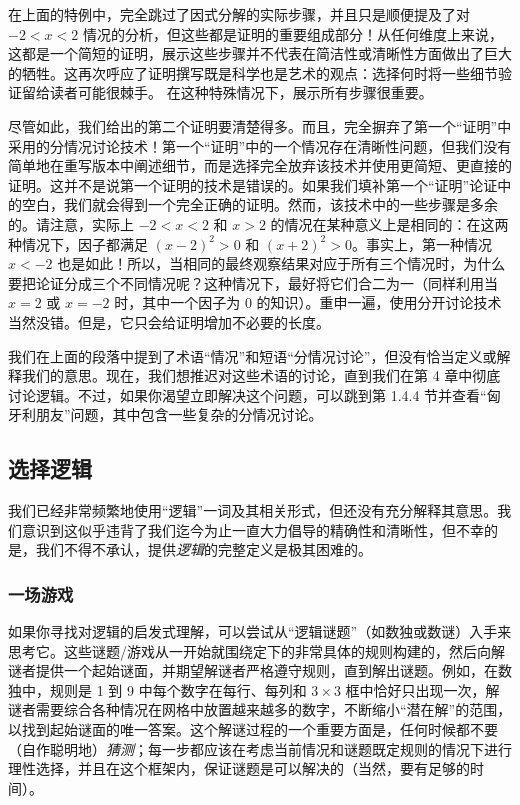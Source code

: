 在上面的特例中，完全跳过了因式分解的实际步骤，并且只是顺便提及了对 $-2 < x < 2$ 情况的分析，但这些都是证明的重要组成部分！从任何维度上来说，这都是一个简短的证明，展示这些步骤并不代表在简洁性或清晰性方面做出了巨大的牺牲。这再次呼应了证明撰写既是科学也是艺术的观点：选择何时将一些细节验证留给读者可能很棘手。 在这种特殊情况下，展示所有步骤很重要。

尽管如此，我们给出的第二个证明要清楚得多。而且，完全摒弃了第一个``证明''中采用的分情况讨论技术！第一个``证明''中的一个情况存在清晰性问题，但我们没有简单地在重写版本中阐述细节，而是选择完全放弃该技术并使用更简短、更直接的证明。这并不是说第一个证明的技术是错误的。如果我们填补第一个``证明''论证中的空白，我们就会得到一个完全正确的证明。然而，该技术中的一些步骤是多余的。请注意，实际上 $-2 < x < 2$ 和 $x > 2$ 的情况在某种意义上是相同的：在这两种情况下，因子都满足 $(x - 2)^2 > 0$ 和 $(x + 2)^2 > 0$。事实上，第一种情况 $x<-2$ 也是如此！所以，当相同的最终观察结果对应于所有三个情况时，为什么要把论证分成三个不同情况呢？这种情况下，最好将它们合二为一（同样利用当 $x = 2$ 或 $x = -2$ 时，其中一个因子为 $0$ 的知识）。重申一遍，使用分开讨论技术当然没错。但是，它只会给证明增加不必要的长度。

我们在上面的段落中提到了术语``情况''和短语``分情况讨论''，但没有恰当定义或解释我们的意思。现在，我们想推迟对这些术语的讨论，直到我们在第 4 章中彻底讨论逻辑。不过，如果你渴望立即解决这个问题，可以跳到第 1.4.4 节并查看``匈牙利朋友''问题，其中包含一些复杂的分情况讨论。

\subsection{选择逻辑}

我们已经非常频繁地使用``逻辑''一词及其相关形式，但还没有充分解释其意思。我们意识到这似乎违背了我们迄今为止一直大力倡导的精确性和清晰性，但不幸的是，我们不得不承认，提供\emph{逻辑}的完整定义是极其困难的。

\subsubsection*{一场游戏}

如果你寻找对逻辑的启发式理解，可以尝试从``逻辑谜题''（如数独或数谜）入手来思考它。这些谜题/游戏从一开始就围绕定下的非常具体的规则构建的，然后向解谜者提供一个起始谜面，并期望解谜者严格遵守规则，直到解出谜题。例如，在数独中，规则是 1 到 9 中每个数字在每行、每列和 $3 \times 3$ 框中恰好只出现一次，解谜者需要综合各种情况在网格中放置越来越多的数字，不断缩小``潜在解''的范围，以找到起始谜面的唯一答案。这个解谜过程的一个重要方面是，任何时候都不要（自作聪明地）\emph{猜测}；每一步都应该在考虑当前情况和谜题既定规则的情况下进行理性选择，并且在这个框架内，保证谜题是可以解决的（当然，要有足够的时间）。

